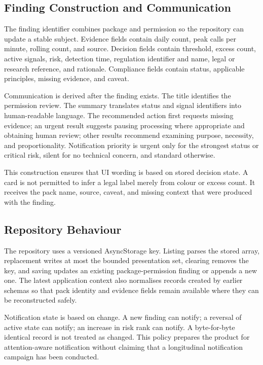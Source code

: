 \subsection{Finding Construction and Communication}

The finding identifier combines package and permission so the repository can update a stable subject. Evidence fields contain daily count, peak calls per minute, rolling count, and source. Decision fields contain threshold, excess count, active signals, risk, detection time, regulation identifier and name, legal or research reference, and rationale. Compliance fields contain status, applicable principles, missing evidence, and caveat.

Communication is derived after the finding exists. The title identifies the permission review. The summary translates status and signal identifiers into human-readable language. The recommended action first requests missing evidence; an urgent result suggests pausing processing where appropriate and obtaining human review; other results recommend examining purpose, necessity, and proportionality. Notification priority is urgent only for the strongest status or critical risk, silent for no technical concern, and standard otherwise.

This construction ensures that UI wording is based on stored decision state. A card is not permitted to infer a legal label merely from colour or excess count. It receives the pack name, source, caveat, and missing context that were produced with the finding.

\subsection{Repository Behaviour}

The repository uses a versioned AsyncStorage key. Listing parses the stored array, replacement writes at most the bounded presentation set, clearing removes the key, and saving updates an existing package-permission finding or appends a new one. The latest application context also normalises records created by earlier schemas so that pack identity and evidence fields remain available where they can be reconstructed safely.

Notification state is based on change. A new finding can notify; a reversal of active state can notify; an increase in risk rank can notify. A byte-for-byte identical record is not treated as changed. This policy prepares the product for attention-aware notification without claiming that a longitudinal notification campaign has been conducted.

